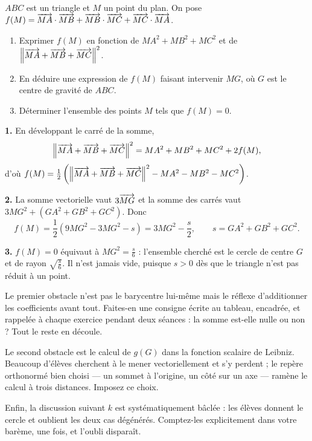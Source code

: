 \begin{concours}
$ABC$ est un triangle et $M$ un point du plan. On pose
$f(M) = \overrightarrow{MA} \cdot \overrightarrow{MB}+\overrightarrow{MB} \cdot \overrightarrow{MC}
+\overrightarrow{MC} \cdot \overrightarrow{MA}$.

\begin{enumerate}[label=\textbf{\arabic*.}, leftmargin=*, itemsep=0.25em]
  \item Exprimer $f(M)$ en fonction de $MA^{2}+MB^{2}+MC^{2}$ et de
        $\left\lVert \overrightarrow{MA}+\overrightarrow{MB}+\overrightarrow{MC} \right\rVert^{2}$.
  \item En déduire une expression de $f(M)$ faisant intervenir $MG$, où $G$
        est le centre de gravité de $ABC$.
  \item Déterminer l'ensemble des points $M$ tels que $f(M) = 0$.
\end{enumerate}
\end{concours}

\begin{corrige}
\textbf{1.} En développant le carré de la somme,
\[
  \left\lVert \overrightarrow{MA}+\overrightarrow{MB}+\overrightarrow{MC} \right\rVert^{2}
  = MA^{2}+MB^{2}+MC^{2}+2f(M),
\]
d'où $f(M) = \frac12\left(\left\lVert \overrightarrow{MA}+\overrightarrow{MB}+\overrightarrow{MC} \right\rVert^{2}
-MA^{2}-MB^{2}-MC^{2}\right)$.

\textbf{2.} La somme vectorielle vaut $3\overrightarrow{MG}$ et la somme des carrés
vaut $3MG^{2}+\left(GA^{2}+GB^{2}+GC^{2}\right)$. Donc
\[
  f(M) = \frac12\left(9MG^{2}-3MG^{2}-s\right) = 3MG^{2}-\frac s2,
  \qquad s = GA^{2}+GB^{2}+GC^{2}.
\]

\textbf{3.} $f(M) = 0$ équivaut à $MG^{2} = \frac{s}{6}$ : l'ensemble
cherché est le cercle de centre $G$ et de rayon $\sqrt{\frac s6}$. Il n'est
jamais vide, puisque $s>0$ dès que le triangle n'est pas réduit à un point.
\end{corrige}

\begin{notepourlaclasse}
Le premier obstacle n'est pas le barycentre lui-même mais le réflexe
d'additionner les coefficients avant tout. Faites-en une consigne écrite au
tableau, encadrée, et rappelée à chaque exercice pendant deux séances : la
somme est-elle nulle ou non ? Tout le reste en découle.

Le second obstacle est le calcul de $g(G)$ dans la fonction scalaire de
Leibniz. Beaucoup d'élèves cherchent à le mener vectoriellement et s'y
perdent ; le repère orthonormé bien choisi — un sommet à l'origine, un côté
sur un axe — ramène le calcul à trois distances. Imposez ce choix.

Enfin, la discussion suivant $k$ est systématiquement bâclée : les élèves
donnent le cercle et oublient les deux cas dégénérés. Comptez-les
explicitement dans votre barème, une fois, et l'oubli disparaît.
\end{notepourlaclasse}

